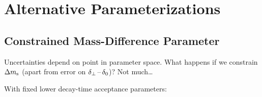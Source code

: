 \section{Alternative Parameterizations}
\label{sec:result_altParam}

\subsection{Constrained Mass-Difference Parameter}
\label{subsec:result_altParam_Delm}

Uncertainties depend on point in parameter space. What happens if we constrain $\Delta m_\text{s}$ (apart from error on $\delta_\perp\,\text{--}\,\delta_\text{0}$)? Not much\ldots

With fixed lower decay-time acceptance parameters:
